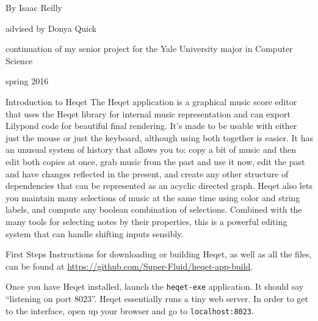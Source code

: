 \documentclass{article}
\begin{document}
\pagestyle{empty}
\begin{center}
\vspace{3cm}

\vspace{2cm}
{\Large By Isaac Reilly}

\vspace{0.15cm}
{\large advised by Donya Quick}

\vspace{0.1cm}
{continuation of my senior project for the Yale University major in Computer Science}

\vspace{13cm}

{\small spring 2016}

\end{center}

\pagebreak

\tableofcontents
\newpage
\pagestyle{plain}

\begin{section}{Introduction to Heqet}
The Heqet application is a graphical music score editor that uses the Heqet library for internal music representation and can export Lilypond code for beautiful final rendering. It's made to be usable with either just the mouse or just the keyboard, although using both together is easier. It has an unusual system of history that allows you to: copy a bit of music and then edit both copies at once, grab music from the past and use it now, edit the past and have changes reflected in the present, and create any other structure of dependencies that can be represented as an acyclic directed graph. Heqet also lets you maintain many selections of music at the same time using color and string labels, and compute any boolean combination of selections. Combined with the many tools for selecting notes by their properties, this is a powerful editing system that can handle shifting inputs sensibly.

\end{section}

\begin{section}{First Steps}
Instructions for downloading or building Heqet, as well as all the files, can be found at \url{https://github.com/Super-Fluid/heqet-app-build}.

Once you have Heqet installed, launch the \texttt{heqet-exe} application. It should say ``listening on port 8023''. Heqet essentially runs a tiny web server. In order to get to the interface, open up your browser and go to \texttt{localhost:8023}.
\end{section}
\end{document}
